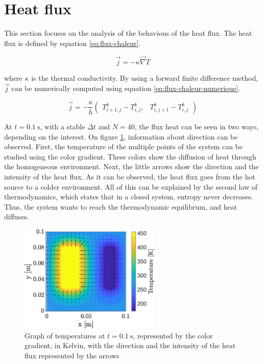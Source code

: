 \documentclass[a4paper,12pt,twoside]{article}
\begin{document}
\section{Heat flux}
This section focuses on the analysis of the behavious of the heat flux.
The heat flux is defined by equation \eqref{eq:flux-chaleur}.

\begin{equation}
  \vec{j} = -\kappa\vec{\nabla} T
  \label{eq:flux-chaleur}
\end{equation}

where $\kappa$ is the thermal conductivity.
By using a forward finite difference method, $\vec{j}$ can be numerically computed using equation \eqref{eq:flux-chaleur-numerique}.

\begin{equation}
  \vec{j} = -\frac{\kappa}{h}
  \begin{pmatrix}
    T^k_{i+1,j} - T^k_{i,j}, & T^k_{i,j+1} - T^k_{i,j}
  \end{pmatrix}
  \label{eq:flux-chaleur-numerique}
\end{equation}

At $t=\SI{0.1}{\s}$, with a stable $\Delta t$ and $N=40$, the flux heat can be seen in two ways, depending on the interest.
On figure \ref{fig:c-temp}, information about direction can be observed.
First, the temperature of the multiple points of the system can be studied using the color gradient.
These colors show the diffusion of heat through the homogeneous environment.
Next, the little arrows show the direction and the intensity of the heat flux.
As it can be observed, the heat flux goes from the hot source to a colder environment.
All of this can be explained by the second law of thermodynamics, which states that in a closed system, entropy never decreases. \cite{wiki:2nd-law}
Thus, the system wants to reach the thermodynamic equilibrum, and heat diffuses.

\begin{figure}[h]
  \centering
  \includegraphics[width=0.6\textwidth]{graphs/c_temp.eps}
  \caption{Graph of temperatures at $t=\SI{0.1}{\s}$, represented by the color gradient, in Kelvin, with the direction and the intensity of the heat flux represented by the arrows}
  \label{fig:c-temp}
\end{figure}
\end{document}
